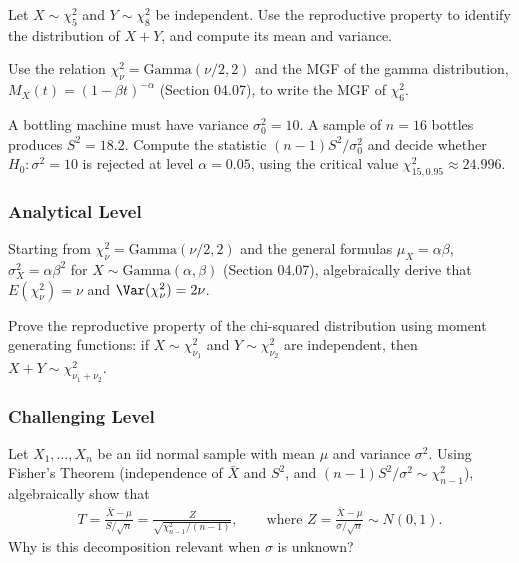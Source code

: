 \begin{problema}
	\label{prob:5.3.4}
	Let $X \sim \chi^2_5$ and $Y \sim \chi^2_8$ be independent. Use the reproductive property to identify the distribution of $X+Y$, and compute its mean and variance.
\end{problema}

\begin{problema}
	\label{prob:5.3.5}
	Use the relation $\chi^2_\nu = \text{Gamma}(\nu/2, 2)$ and the MGF of the gamma distribution, $M_{X}(t)=(1-\beta t)^{-\alpha}$ (Section 04.07), to write the MGF of $\chi^2_6$.
\end{problema}

\begin{problema}
	\label{prob:5.3.6}
	A bottling machine must have variance $\sigma_0^2=10$. A sample of $n=16$ bottles produces $S^2=18.2$. Compute the statistic $(n-1)S^2/\sigma_0^2$ and decide whether $H_0: \sigma^2=10$ is rejected at level $\alpha=0.05$, using the critical value $\chi^2_{15,0.95}\approx 24.996$.
\end{problema}

\subsubsection*{Analytical Level}

\begin{problema}
	\label{prob:5.3.7}
	Starting from $\chi^2_\nu = \text{Gamma}(\nu/2, 2)$ and the general formulas $\mu_X=\alpha\beta$, $\sigma_X^2=\alpha\beta^2$ for $X\sim\text{Gamma}(\alpha,\beta)$ (Section 04.07), algebraically derive that $E(\chi^2_\nu)=\nu$ and $\Var(\chi^2_\nu)=2\nu$.
\end{problema}

\begin{problema}
	\label{prob:5.3.8}
	Prove the reproductive property of the chi-squared distribution using moment generating functions: if $X\sim\chi^2_{\nu_1}$ and $Y\sim\chi^2_{\nu_2}$ are independent, then $X+Y\sim\chi^2_{\nu_1+\nu_2}$.
\end{problema}

\subsubsection*{Challenging Level}

\begin{problema}
	\label{prob:5.3.9}
	Let $X_1,\ldots,X_n$ be an iid normal sample with mean $\mu$ and variance $\sigma^2$. Using Fisher's Theorem (independence of $\bar X$ and $S^2$, and $(n-1)S^2/\sigma^2\sim\chi^2_{n-1}$), algebraically show that
	\begin{align*}
		T = \frac{\bar X-\mu}{S/\sqrt n} = \frac{Z}{\sqrt{\chi^2_{n-1}/(n-1)}}, \qquad \text{where } Z=\frac{\bar X-\mu}{\sigma/\sqrt n} \sim N(0,1).
	\end{align*}
	Why is this decomposition relevant when $\sigma$ is unknown?
\end{problema}

